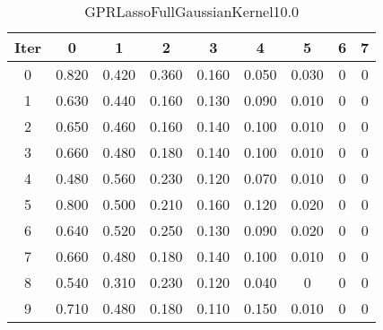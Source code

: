 \begin{table}
	\begin{center}
		\begin{tabular}{|c|c|c|c|c|c|c|c|c|}
			\hline
			Iter & 0 & 1 & 2 & 3 & 4 & 5 & 6 & 7 \\
			\hline
			0 & 0.820 & 0.420 & 0.360 & 0.160 & 0.050 & 0.030 & 0 & 0 \\
			\hline
			1 & 0.630 & 0.440 & 0.160 & 0.130 & 0.090 & 0.010 & 0 & 0 \\
			\hline
			2 & 0.650 & 0.460 & 0.160 & 0.140 & 0.100 & 0.010 & 0 & 0 \\
			\hline
			3 & 0.660 & 0.480 & 0.180 & 0.140 & 0.100 & 0.010 & 0 & 0 \\
			\hline
			4 & 0.480 & 0.560 & 0.230 & 0.120 & 0.070 & 0.010 & 0 & 0 \\
			\hline
			5 & 0.800 & 0.500 & 0.210 & 0.160 & 0.120 & 0.020 & 0 & 0 \\
			\hline
			6 & 0.640 & 0.520 & 0.250 & 0.130 & 0.090 & 0.020 & 0 & 0 \\
			\hline
			7 & 0.660 & 0.480 & 0.180 & 0.140 & 0.100 & 0.010 & 0 & 0 \\
			\hline
			8 & 0.540 & 0.310 & 0.230 & 0.120 & 0.040 & 0 & 0 & 0 \\
			\hline
			9 & 0.710 & 0.480 & 0.180 & 0.110 & 0.150 & 0.010 & 0 & 0 \\
			\hline
		\end{tabular}
	\end{center}
	\caption{GPRLassoFullGaussianKernel10.0}
\end{table}